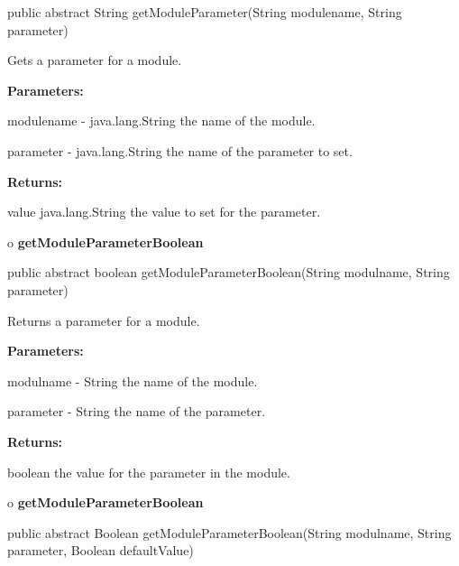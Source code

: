 \begin{PRE}
 public abstract String getModuleParameter(String modulename,
                                           String parameter)
\end{PRE}

\begin{description}
\htmlDD Gets a parameter for a module. 

\begin{description}
\item {\bf Parameters:}  

modulename - java.lang.String the name of the module.  

parameter - java.lang.String the name of the parameter to set.  
\item {\bf Returns:}  

value java.lang.String the value to set for the parameter.  
\end{description}

\end{description}

o {\bf getModuleParameterBoolean} 

\begin{PRE}
 public abstract boolean getModuleParameterBoolean(String modulname,
                                                   String parameter)
\end{PRE}

\begin{description}
\htmlDD Returns a parameter for a module. 

\begin{description}
\item {\bf Parameters:}  

modulname - String the name of the module.  

parameter - String the name of the parameter.  
\item {\bf Returns:}  

boolean the value for the parameter in the module.  
\end{description}

\end{description}

o {\bf getModuleParameterBoolean} 

\begin{PRE}
 public abstract Boolean getModuleParameterBoolean(String modulname,
                                                   String parameter,
                                                   Boolean defaultValue)
\end{PRE}

